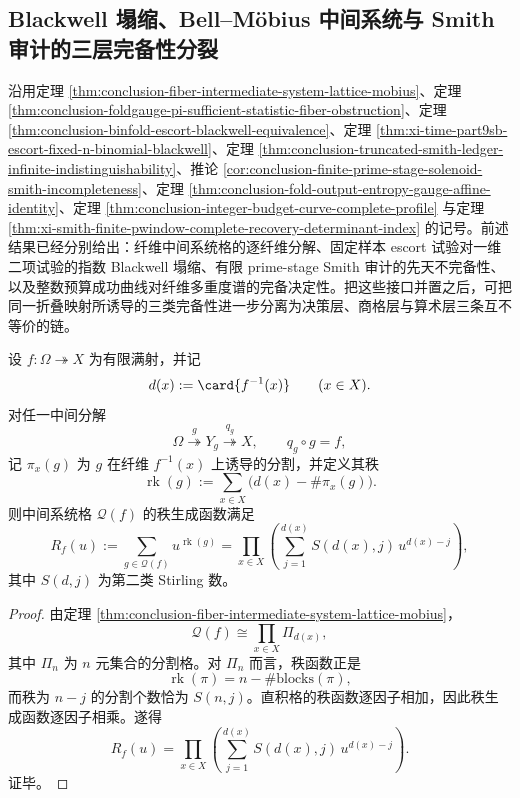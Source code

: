 \subsection{Blackwell 塌缩、Bell--Möbius 中间系统与 Smith 审计的三层完备性分裂}\label{subsec:conclusion-three-completenesses-blackwell-bell-mobius-smith}

沿用定理 \ref{thm:conclusion-fiber-intermediate-system-lattice-mobius}、定理 \ref{thm:conclusion-foldgauge-pi-sufficient-statistic-fiber-obstruction}、定理 \ref{thm:conclusion-binfold-escort-blackwell-equivalence}、定理 \ref{thm:xi-time-part9sb-escort-fixed-n-binomial-blackwell}、定理 \ref{thm:conclusion-truncated-smith-ledger-infinite-indistinguishability}、推论 \ref{cor:conclusion-finite-prime-stage-solenoid-smith-incompleteness}、定理 \ref{thm:conclusion-fold-output-entropy-gauge-affine-identity}、定理 \ref{thm:conclusion-integer-budget-curve-complete-profile} 与定理 \ref{thm:xi-smith-finite-pwindow-complete-recovery-determinant-index} 的记号。前述结果已经分别给出：纤维中间系统格的逐纤维分解、固定样本 escort 试验对一维二项试验的指数 Blackwell 塌缩、有限 prime-stage Smith 审计的先天不完备性、以及整数预算成功曲线对纤维多重度谱的完备决定性。把这些接口并置之后，可把同一折叠映射所诱导的三类完备性进一步分离为决策层、商格层与算术层三条互不等价的链。

\begin{theorem}[中间系统格的秩生成函数完全因子化]\label{thm:conclusion-intermediate-system-rank-generating-factorization}
设 \(f:\Omega\twoheadrightarrow X\) 为有限满射，并记
\[
d(x):=\card{f^{-1}(x)}\qquad(x\in X).
\]
对任一中间分解
\[
\Omega\overset{\,g\,}{\twoheadrightarrow}Y_g\overset{\,q_g\,}{\twoheadrightarrow}X,
\qquad
q_g\circ g=f,
\]
记 \(\pi_x(g)\) 为 \(g\) 在纤维 \(f^{-1}(x)\) 上诱导的分割，并定义其秩
\[
\operatorname{rk}(g):=\sum_{x\in X}\bigl(d(x)-\#\pi_x(g)\bigr).
\]
则中间系统格 \(\mathcal Q(f)\) 的秩生成函数满足
\[
R_f(u):=\sum_{g\in\mathcal Q(f)}u^{\operatorname{rk}(g)}
=
\prod_{x\in X}
\left(
\sum_{j=1}^{d(x)}S(d(x),j)\,u^{d(x)-j}
\right),
\]
其中 \(S(d,j)\) 为第二类 Stirling 数。
\end{theorem}
\begin{proof}
由定理 \ref{thm:conclusion-fiber-intermediate-system-lattice-mobius}，
\[
\mathcal Q(f)\cong \prod_{x\in X}\Pi_{d(x)},
\]
其中 \(\Pi_n\) 为 \(n\) 元集合的分割格。对 \(\Pi_n\) 而言，秩函数正是
\[
\operatorname{rk}(\pi)=n-\#\text{blocks}(\pi),
\]
而秩为 \(n-j\) 的分割个数恰为 \(S(n,j)\)。直积格的秩函数逐因子相加，因此秩生成函数逐因子相乘。遂得
\[
R_f(u)
=
\prod_{x\in X}
\left(
\sum_{j=1}^{d(x)}S(d(x),j)\,u^{d(x)-j}
\right).
\]
证毕。
\end{proof}

